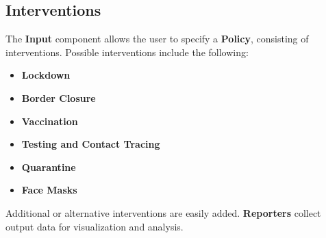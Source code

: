 \documentclass[10pt,letterpaper]{article}
\begin{document}
\pagebreak

\subsection*{Interventions}
The \textbf{Input} component allows the user to specify a \textbf{Policy}, consisting of interventions. Possible interventions include the following:
\begin{itemize}
\item \textbf{Lockdown}
\item \textbf{Border Closure}
\item \textbf{Vaccination}
\item \textbf{Testing and Contact Tracing}
\item \textbf{Quarantine}
\item \textbf{Face Masks}
\end{itemize}
Additional or alternative interventions are easily added. \textbf{Reporters} collect output data for visualization and analysis.
\end{document}
